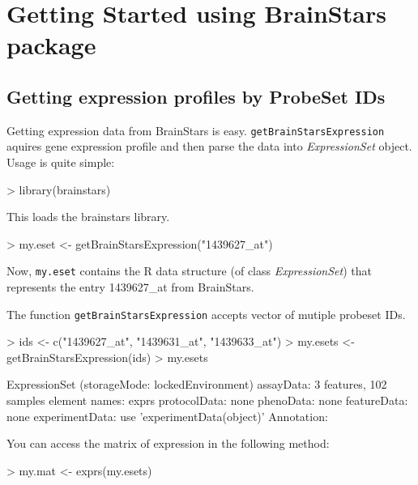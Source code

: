 \documentclass[12pt,fullpage]{article}
\newcommand{\Rfunction}[1]{{\texttt{#1}}}
\newcommand{\Robject}[1]{{\texttt{#1}}}
\newcommand{\Rclass}[1]{{\textit{#1}}}
\begin{document}
\section{Getting Started using BrainStars package}
\subsection{Getting expression profiles by ProbeSet IDs}
Getting expression data from BrainStars is easy.  \Rfunction{getBrainStarsExpression} 
aquires gene expression profile and then parse the data into \Rclass{ExpressionSet} 
object.  Usage is quite simple:

\begin{Schunk}
\begin{Sinput}
> library(brainstars)
\end{Sinput}
\end{Schunk}

This loads the brainstars library.

\begin{Schunk}
\begin{Sinput}
> my.eset <- getBrainStarsExpression("1439627_at")
\end{Sinput}
\end{Schunk}

Now, \Robject{my.eset} contains the R data structure (of class \Rclass{ExpressionSet}) that represents the entry 1439627\_at from BrainStars.

The function \Rfunction{getBrainStarsExpression} accepts vector of mutiple probeset IDs.
\begin{Schunk}
\begin{Sinput}
> ids <- c("1439627_at", "1439631_at", "1439633_at")
> my.esets <- getBrainStarsExpression(ids)
> my.esets
\end{Sinput}
\begin{Soutput}
ExpressionSet (storageMode: lockedEnvironment)
assayData: 3 features, 102 samples 
  element names: exprs 
protocolData: none
phenoData: none
featureData: none
experimentData: use 'experimentData(object)'
Annotation:  
\end{Soutput}
\end{Schunk}

You can access the matrix of expression in the following method:
\begin{Schunk}
\begin{Sinput}
> my.mat <- exprs(my.esets)
\end{Sinput}
\end{Schunk}
\end{document}
